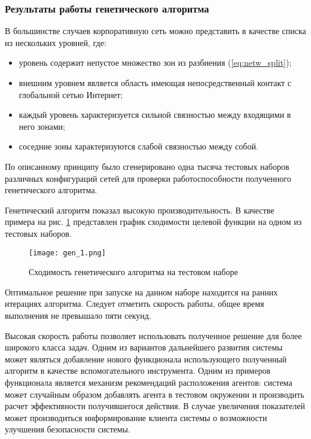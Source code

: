 \subsubsection{Результаты работы генетического алгоритма}\hspace*{\fill}

В большинстве случаев корпоративную сеть можно представить в качестве списка из нескольких уровней, где:
\begin{itemize}
	\item уровень содержит непустое множество зон из разбиения (\ref{eq:netw_split});
	\item внешним уровнем является область имеющая непосредственный контакт с глобальной сетью Интернет;
	\item каждый уровень характеризуется сильной связностью между входящими в него зонами;
	\item соседние зоны характеризуются слабой связностью между собой. 
\end{itemize}

По описанному принципу было сгенерировано  одна тысяча тестовых наборов различных конфигураций сетей для проверки работоспособности полученного генетического алгоритма.

Генетический алгоритм показал высокую производительность. В качестве примера на рис. \ref{fig:gen_1} представлен график сходимости целевой функции на одном из тестовых наборов.

\begin{figure}[ht]
\centering
	\texttt{[image: gen\_1.png]}  
	\caption{Сходимость генетического алгоритма на тестовом наборе}
	\label{fig:gen_1}
\end{figure}

Оптимальное решение при запуске на данном наборе находится на ранних итерациях алгоритма. Следует отметить скорость работы, общее время выполнения не превышало пяти секунд. 

Высокая скорость работы позволяет использовать полученное решение для более широкого класса задач. Одним из вариантов дальнейшего развития системы может являться добавление нового функционала использующего полученный алгоритм в качестве вспомогательного инструмента. Одним из примеров функционала является механизм рекомендаций расположения агентов: система может случайным образом добавлять агента в тестовом окружении и производить расчет эффективности получившегося действия. В случае увеличения показателей может производиться информирование клиента системы о возможности улучшения безопасности системы.

